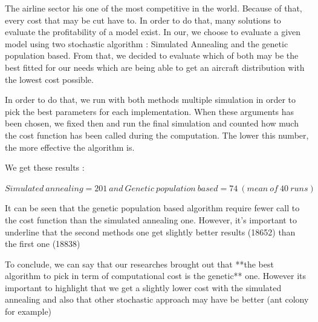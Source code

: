 \documentclass[11pt]{article}
\begin{document}
The airline sector his one of the most competitive in the world. Because of that, every cost that may be cut have to. In order to do that, many solutions to evaluate the profitability of a model exist. In our, we choose to evaluate a given model using two stochastic algorithm : Simulated Annealing and the genetic population based. From that, we decided to evaluate which of both may be the best fitted for our needs which are being able to get an aircraft distribution with the lowest cost possible. 

In order to do that, we run with both methods multiple simulation in order to pick the best parameters for each implementation. When these arguments has been chosen, we fixed then and run the final simulation and counted how much the cost function has been called during the computation. The lower this number, the more effective the algorithm is. 

We get these results : 

\begin{center}
    \(Simulated\ annealing=201\ and\ Genetic\ population\ based=74\ (mean\ of\ 40\ runs)\)
\end{center}
    
It can be seen that the genetic population based algorithm require fewer call to the cost function than the simulated annealing one. However, it's important to underline that the second methods one get slightly better results (18652) than the first one (18838)
    
To conclude, we can say that our researches brought out that **the best algorithm to pick in term of computational cost is the genetic** one. However its important to highlight that we get a slightly lower cost with the simulated annealing and also that other stochastic approach may have be better (ant colony for example)



    
    
    
\end{document}
